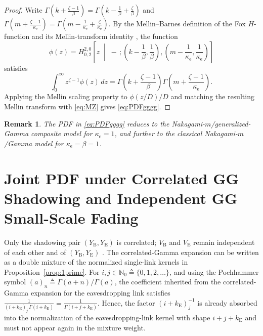 \documentclass[lettersize,journal]{IEEEtran}
\newtheorem{remark}{Remark}
\begin{document}
\begin{proof}
Write \(\Gamma\!\left(k+\frac{\zeta-1}{\beta}\right)
=\Gamma\!\left(k-\frac{1}{\beta}+\frac{\zeta}{\beta}\right)\) and
\(\Gamma\!\left(m+\frac{\zeta-1}{\kappa_{\mathrm e}}\right)
=\Gamma\!\left(m-\frac{1}{\kappa_{\mathrm e}}+\frac{\zeta}{\kappa_{\mathrm e}}\right)\).
By the Mellin--Barnes definition of the Fox \(H\)-function and its
Mellin-transform identity \cite{mathai2009h}, the function
\[
\phi(z)=H^{2,0}_{0,2}\!\left[
z\;\middle|\;-\,;
\left(k-\frac{1}{\beta},\frac{1}{\beta}\right),
\left(m-\frac{1}{\kappa_{\mathrm e}},\frac{1}{\kappa_{\mathrm e}}\right)
\right]
\]
satisfies
\[
\int_0^\infty z^{\zeta-1}\phi(z)\,dz
=
\Gamma\!\left(k+\frac{\zeta-1}{\beta}\right)
\Gamma\!\left(m+\frac{\zeta-1}{\kappa_{\mathrm e}}\right).
\]
Applying the Mellin scaling property to \(\phi(z/D)/D\) and matching the
resulting Mellin transform with \eqref{eq:MZ} gives \eqref{eq:PDFgggg}.
\end{proof}

\begin{remark}
The PDF in \eqref{eq:PDFgggg} reduces to the Nakagami-\(m\)/generalized-Gamma composite model for \(\kappa_{\mathrm e}=1\), and further to the classical Nakagami-\(m\)/Gamma model for \(\kappa_{\mathrm e}=\beta=1\).
\end{remark}


\section{Joint PDF under Correlated GG Shadowing and Independent GG Small-Scale Fading}
\label{sec:jointpdf}

Only the shadowing pair \((Y_{\mathrm B},Y_{\mathrm E})\) is correlated; \(V_{\mathrm B}\) and \(V_{\mathrm E}\) remain independent of each other and of \((Y_{\mathrm B},Y_{\mathrm E})\) \cite{5281755}. The correlated-Gamma expansion can be written as a double mixture of the normalized single-link kernels in Proposition~\ref{prop:1prime}. For \(i,j\in\mathbb N_0\triangleq\{0,1,2,\ldots\}\), and using the Pochhammer symbol \((a)_n\triangleq\Gamma(a+n)/\Gamma(a)\), the coefficient inherited from the correlated-Gamma expansion for the eavesdropping link satisfies \(\displaystyle \frac{1}{(i+k_{\mathrm E})_j\,\Gamma(i+k_{\mathrm E})}=\frac{1}{\Gamma(i+j+k_{\mathrm E})}\). Hence, the factor \((i+k_{\mathrm E})_j^{-1}\) is already absorbed into the normalization of the eavesdropping-link kernel with shape \(i+j+k_{\mathrm E}\) and must not appear again in the mixture weight.
\end{document}
